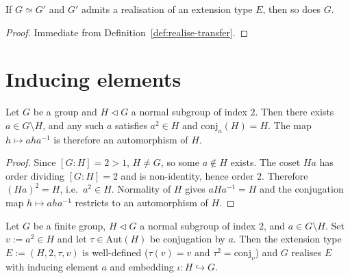 \begin{lemma}
  \label{lem:realise-of-mulEquiv}
  \leanok
  If $G \simeq G'$ and $G'$ admits a realisation of an extension type $E$, then
  so does $G$.
\end{lemma}

\begin{proof}
  Immediate from Definition~\ref{def:realise-transfer}.
\end{proof}

\section{Inducing elements}

\begin{lemma}
  \label{lem:inducing-element-exists}
  Let $G$ be a group and $H \triangleleft G$ a normal subgroup of index $2$.
  Then there exists $a \in G \setminus H$, and any such $a$ satisfies
  $a^2 \in H$ and $\mathrm{conj}_a(H) = H$. The map $h \mapsto a h a^{-1}$ is
  therefore an automorphism of $H$.
\end{lemma}

\begin{proof}
  Since $[G : H] = 2 > 1$, $H \neq G$, so some $a \notin H$ exists. The coset
  $Ha$ has order dividing $[G : H] = 2$ and is non-identity, hence order $2$.
  Therefore $(Ha)^2 = H$, i.e.\ $a^2 \in H$. Normality of $H$ gives
  $aHa^{-1} = H$ and the conjugation map $h \mapsto aha^{-1}$ restricts to an
  automorphism of $H$.
\end{proof}

\begin{lemma}
  \label{lem:realise-from-normal-index-2}
  Let $G$ be a finite group, $H \triangleleft G$ a normal subgroup of index $2$,
  and $a \in G \setminus H$. Set $v := a^2 \in H$ and let
  $\tau \in \mathrm{Aut}(H)$ be conjugation by $a$. Then the extension type
  $E := (H, 2, \tau, v)$ is well-defined ($\tau(v) = v$ and $\tau^2 =
  \mathrm{conj}_v$) and $G$ realises $E$ with inducing element $a$ and
  embedding $\iota : H \hookrightarrow G$.
\end{lemma}

